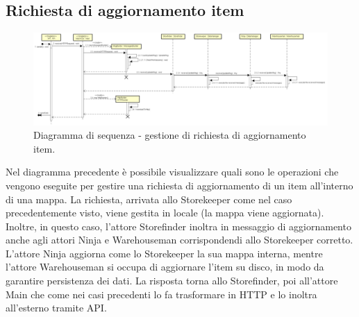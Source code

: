 \documentclass[a4paper]{article}
\begin{document}
        \subsection{Richiesta di aggiornamento item}
            \begin{figure} [H]
				\centering
				\includegraphics[width=\textwidth]{ST/seq/GestioneUpdateEntry.png}
				\caption{Diagramma di sequenza - gestione di richiesta di aggiornamento item.}
			\end{figure}
            Nel diagramma precedente è possibile visualizzare quali sono le operazioni che vengono eseguite per gestire una richiesta di aggiornamento di un item 
            all'interno di una mappa. La richiesta, arrivata allo Storekeeper come nel caso precedentemente visto, viene gestita in locale (la mappa viene aggiornata).
            Inoltre, in questo caso, l'attore Storefinder inoltra in messaggio di aggiornamento anche agli attori Ninja e Warehouseman corrispondendi allo Storekeeper 
            corretto. L'attore Ninja aggiorna come lo Storekeeper la sua mappa interna, mentre l'attore Warehouseman si occupa di aggiornare l'item su disco, in modo 
            da garantire persistenza dei dati. La risposta torna allo Storefinder, poi all'attore Main che come nei casi precedenti lo fa trasformare in HTTP e lo 
            inoltra all'esterno tramite API.
            
\end{document}
